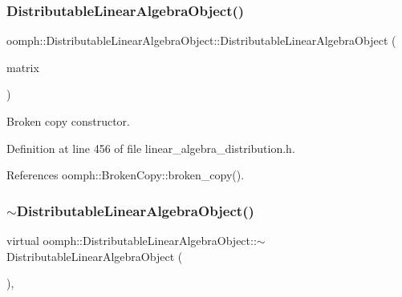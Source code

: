 \subsubsection{\texorpdfstring{Distributable\+Linear\+Algebra\+Object()}{DistributableLinearAlgebraObject()}\hspace{0.1cm}{\footnotesize\ttfamily [2/2]}}
{\footnotesize\ttfamily oomph\+::\+Distributable\+Linear\+Algebra\+Object\+::\+Distributable\+Linear\+Algebra\+Object (\begin{DoxyParamCaption}\item[{const \hyperlink{classoomph_1_1DistributableLinearAlgebraObject}{Distributable\+Linear\+Algebra\+Object} \&}]{matrix }\end{DoxyParamCaption})\hspace{0.3cm}{\ttfamily [inline]}}



Broken copy constructor. 



Definition at line 456 of file linear\+\_\+algebra\+\_\+distribution.\+h.



References oomph\+::\+Broken\+Copy\+::broken\+\_\+copy().

\mbox{\label{classoomph_1_1DistributableLinearAlgebraObject_a4038de53b5737dc625411e7848d21dad}} 
\subsubsection{\texorpdfstring{$\sim$\+Distributable\+Linear\+Algebra\+Object()}{~DistributableLinearAlgebraObject()}}
{\footnotesize\ttfamily virtual oomph\+::\+Distributable\+Linear\+Algebra\+Object\+::$\sim$\+Distributable\+Linear\+Algebra\+Object (\begin{DoxyParamCaption}{ }\end{DoxyParamCaption})\hspace{0.3cm}{\ttfamily [inline]}, {\ttfamily [virtual]}}




